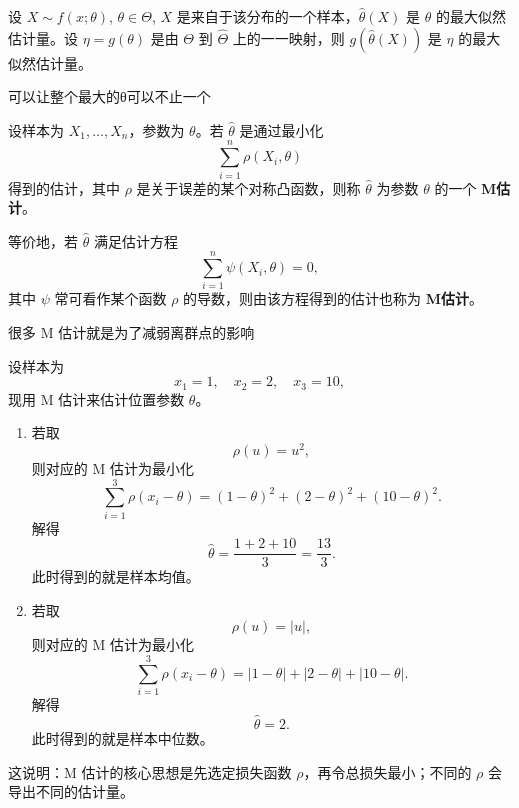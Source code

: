 \begin{theorem}
设 \(X\sim f(x;\theta)\), \(\theta\in\Theta\), \(X\) 是来自于该分布的一个样本，\(\hat{\theta}(X)\) 是 \(\theta\) 的最大似然估计量。设 \(\eta=g(\theta)\) 是由 \(\Theta\) 到 \(\hat{\Theta}\) 上的一一映射，则 \(g(\hat{\theta}(X))\) 是 \(\eta\) 的最大似然估计量。
\end{theorem}
\begin{note}
  可以让整个最大的θ可以不止一个
\end{note}
\begin{definition}[M估计]
设样本为 \(X_1,\dots,X_n\)，参数为 \(\theta\)。若 \(\hat{\theta}\) 是通过最小化
\[
\sum_{i=1}^n \rho(X_i,\theta)
\]
得到的估计，其中 \(\rho\) 是关于误差的某个对称凸函数，则称 \(\hat{\theta}\) 为参数 \(\theta\) 的一个 \textbf{M估计}。

等价地，若 \(\hat{\theta}\) 满足估计方程
\[
\sum_{i=1}^n \psi(X_i,\theta)=0,
\]
其中 \(\psi\) 常可看作某个函数 \(\rho\) 的导数，则由该方程得到的估计也称为 \textbf{M估计}。
\end{definition}
\begin{dxtips}
    很多 M 估计就是为了减弱离群点的影响
\end{dxtips}
\begin{example}
设样本为
\[
x_1=1,\quad x_2=2,\quad x_3=10,
\]
现用 M 估计来估计位置参数 \(\theta\)。

\begin{enumerate}
    \item 若取
    \[
    \rho(u)=u^2,
    \]
    则对应的 M 估计为最小化
    \[
    \sum_{i=1}^3 \rho(x_i-\theta)
    =(1-\theta)^2+(2-\theta)^2+(10-\theta)^2.
    \]
    解得
    \[
    \hat{\theta}=\frac{1+2+10}{3}=\frac{13}{3}.
    \]
    此时得到的就是样本均值。

    \item 若取
    \[
    \rho(u)=|u|,
    \]
    则对应的 M 估计为最小化
    \[
    \sum_{i=1}^3 \rho(x_i-\theta)
    =|1-\theta|+|2-\theta|+|10-\theta|.
    \]
    解得
    \[
    \hat{\theta}=2.
    \]
    此时得到的就是样本中位数。
\end{enumerate}

这说明：M 估计的核心思想是先选定损失函数 \(\rho\)，再令总损失最小；不同的 \(\rho\) 会导出不同的估计量。
\end{example}

